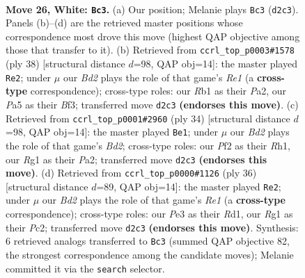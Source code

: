 \documentclass[11pt]{article}
\begin{document}
\clearpage

\begin{figure}[p]\centering
\begin{subfigure}{0.46\textwidth}\centering
\resizebox{\linewidth}{!}{%
\newchessgame
\chessboard[
  setfen={rk3b2/pp4pr/2p1b2p/P2p1p2/2qP3P/3QPN2/1PKB1PP1/1R4R1 w - - 3 26},
  showmover=false,
  pgfstyle=straightmove, color=movearrow, markmove={d2-c3}
]}
\caption{}
\end{subfigure}\hfill
\begin{subfigure}{0.46\textwidth}\centering
\resizebox{\linewidth}{!}{%
\newchessgame
\chessboard[
  setfen={1k5r/1prbbp2/pq1ppp2/5P1p/4P2P/2N2B2/PPPQ2P1/K2RR3 w - - 9 20},
  showmover=false,
  pgfstyle=straightmove, color=movearrow, markmove={e1-e2}
]}
\caption{}
\end{subfigure}
\\[4pt]
\begin{subfigure}{0.46\textwidth}\centering
\resizebox{\linewidth}{!}{%
\newchessgame
\chessboard[
  setfen={2k4r/ppprp1b1/3q3p/3P1p2/6nP/2N1pP2/PPPBQ1P1/2KR3R w - - 0 18},
  showmover=false,
  pgfstyle=straightmove, color=movearrow, markmove={d2-e1}
]}
\caption{}
\end{subfigure}\hfill
\begin{subfigure}{0.46\textwidth}\centering
\resizebox{\linewidth}{!}{%
\newchessgame
\chessboard[
  setfen={1k5r/1prbbp2/p2ppp2/2q2P1p/4P2P/2N2B2/PPPQ2P1/1K1RR3 w - - 5 19},
  showmover=false,
  pgfstyle=straightmove, color=movearrow, markmove={e1-e2}
]}
\caption{}
\end{subfigure}
\caption{\textbf{Move 26, White: \texttt{Bc3}.} (a) Our position; Melanie plays \texttt{Bc3} (\texttt{d2c3}). Panels (b)--(d) are the retrieved master positions whose correspondence most drove this move (highest QAP objective among those that transfer to it). (b) Retrieved from \texttt{ccrl\_top\_p0003\#1578} (ply 38) [structural distance $d$=98, QAP obj=14]: the master played \texttt{Re2}; under $\mu$ our \emph{Bd2} plays the role of that game's \emph{Re1} (a \textbf{cross-type} correspondence); cross-type roles: our \emph{R}b1 as their \emph{P}a2, our \emph{P}a5 as their \emph{B}f3; transferred move \texttt{d2c3} \textbf{(endorses this move)}. (c) Retrieved from \texttt{ccrl\_top\_p0001\#2960} (ply 34) [structural distance $d$=98, QAP obj=14]: the master played \texttt{Be1}; under $\mu$ our \emph{Bd2} plays the role of that game's \emph{Bd2}; cross-type roles: our \emph{P}f2 as their \emph{R}h1, our \emph{R}g1 as their \emph{P}a2; transferred move \texttt{d2c3} \textbf{(endorses this move)}. (d) Retrieved from \texttt{ccrl\_top\_p0000\#1126} (ply 36) [structural distance $d$=89, QAP obj=14]: the master played \texttt{Re2}; under $\mu$ our \emph{Bd2} plays the role of that game's \emph{Re1} (a \textbf{cross-type} correspondence); cross-type roles: our \emph{P}e3 as their \emph{R}d1, our \emph{R}g1 as their \emph{P}c2; transferred move \texttt{d2c3} \textbf{(endorses this move)}. Synthesis: 6 retrieved analogs transferred to \texttt{Bc3} (summed QAP objective 82, the strongest correspondence among the candidate moves); Melanie committed it via the \texttt{search} selector.}
\label{fig:thought-m50}
\end{figure}
\end{document}

